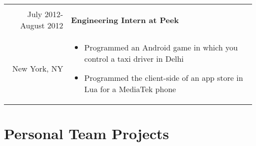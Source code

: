 \documentclass[letterpaper,10pt]{article} %
\begin{document}
\begin{longtable}{r|p{4.5in}}
    \multicolumn{2}{c}{} \\

    \newpage

    July 2012-August 2012 & \textbf{Engineering Intern at Peek} \\
    New York, NY & \begin{itemize}
        \item Programmed an Android game in which you control a taxi driver in Delhi
        \item Programmed the client-side of an app store in Lua for a MediaTek phone
    \end{itemize}
\end{longtable}

\section{Personal Team Projects}
\end{document}
